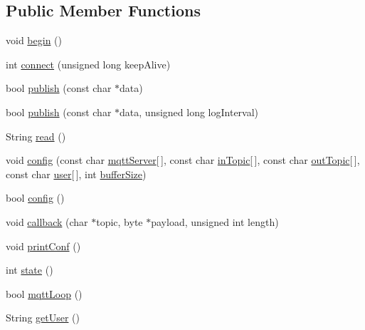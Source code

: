 \subsection*{Public Member Functions}
\begin{DoxyCompactItemize}
\item 
void \hyperlink{class_cool_m_q_t_t_ac9248808641ebf3054ed0620ea9d0100}{begin} ()
\item 
int \hyperlink{class_cool_m_q_t_t_a50075d0ab23a327ab897fd6adad20eda}{connect} (unsigned long keep\+Alive)
\item 
bool \hyperlink{class_cool_m_q_t_t_ace977b3e90ab14b1199fe5c4fb0a13ec}{publish} (const char $\ast$data)
\item 
bool \hyperlink{class_cool_m_q_t_t_a613c5e3927ae85bb94fbf648d84d8780}{publish} (const char $\ast$data, unsigned long log\+Interval)
\item 
String \hyperlink{class_cool_m_q_t_t_ae3c18f6ae9723746d32765f1c8f176ca}{read} ()
\item 
void \hyperlink{class_cool_m_q_t_t_a9b703de4f1358f0ee7a5e8c44979c648}{config} (const char \hyperlink{class_cool_m_q_t_t_ab8bb951f87ddbf92db74c2ad16a3e53e}{mqtt\+Server}\mbox{[}$\,$\mbox{]}, const char \hyperlink{class_cool_m_q_t_t_a4492f52a441e83cc5151010317fdb52d}{in\+Topic}\mbox{[}$\,$\mbox{]}, const char \hyperlink{class_cool_m_q_t_t_a109c786a17b463f9eeba046194279522}{out\+Topic}\mbox{[}$\,$\mbox{]}, const char \hyperlink{class_cool_m_q_t_t_a8cd47e45d457f908d4b4390b35aaee83}{user}\mbox{[}$\,$\mbox{]}, int \hyperlink{class_cool_m_q_t_t_a7f3cf26b51d6770f216e42c5ef13ca9f}{buffer\+Size})
\item 
bool \hyperlink{class_cool_m_q_t_t_a6571671781a505feca9a8a56e256c6bc}{config} ()
\item 
void \hyperlink{class_cool_m_q_t_t_a30d82ad665bfb603f46ecdbc290775df}{callback} (char $\ast$topic, byte $\ast$payload, unsigned int length)
\item 
void \hyperlink{class_cool_m_q_t_t_a40553a0ad4b5ecf1cb4411ab54ca85fb}{print\+Conf} ()
\item 
int \hyperlink{class_cool_m_q_t_t_a5d003307eff78efbd585e42b43b72b6d}{state} ()
\item 
bool \hyperlink{class_cool_m_q_t_t_aa5eaae967b562b62cbcf2b8d81f6e5d5}{mqtt\+Loop} ()
\item 
String \hyperlink{class_cool_m_q_t_t_a373cc92fca7760d886f02d8a6e5b3f63}{get\+User} ()
\end{DoxyCompactItemize}
